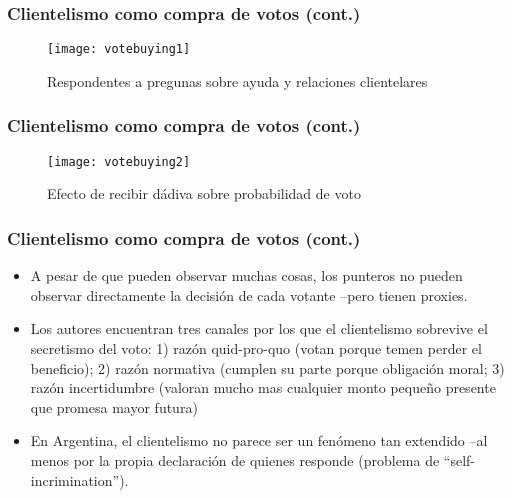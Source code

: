 \documentclass[handout,final,xcolor=dvipsnames]{beamer}
\begin{document}
   \begin{frame}\frametitle{Clientelismo como compra de votos (cont.)}
\begin{figure}[!htbp]
  \centering \vspace{-0.5cm}
 \caption{Respondentes a pregunas sobre ayuda y relaciones clientelares}
  \label{fig:lic1}
  \texttt{[image: votebuying1]}
 \end{figure}
\end{frame}



 \begin{frame}\frametitle{Clientelismo como compra de votos (cont.)}
\begin{figure}[!htbp]
  \centering \vspace{-0.5cm}
 \caption{Efecto de recibir dádiva sobre probabilidad de voto}
  \label{fig:lic1}
  \texttt{[image: votebuying2]}
 \end{figure}
\end{frame}



 \begin{frame}\frametitle{Clientelismo como compra de votos (cont.)}
   \begin{itemize}\itemsep 10pt
     \item A pesar de que pueden observar muchas cosas, los punteros
       no pueden observar directamente la decisión de cada votante
       --pero tienen proxies. 
  \item Los autores encuentran tres canales por los que el
    clientelismo sobrevive el secretismo del voto: 1) razón
    quid-pro-quo (votan porque temen perder el beneficio); 2) razón
    normativa (cumplen su parte porque obligación moral; 3) razón
    incertidumbre (valoran mucho mas cualquier monto pequeño presente
    que promesa mayor futura)
    \item En Argentina, el clientelismo no parece ser un fenómeno tan
      extendido --al menos por la propia declaración de quienes
      responde (problema de ``self-incrimination''). 
  \end{itemize}
  \end{frame}

  
\end{document}
